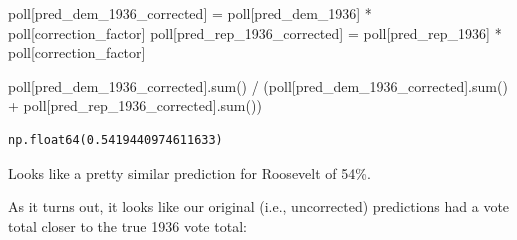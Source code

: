 \documentclass[
  letterpaper,
  DIV=11,
  numbers=noendperiod]{scrreprt}
\newenvironment{Shaded}{\begin{snugshade}}{\end{snugshade}}
\newcommand{\BuiltInTok}[1]{\textcolor[rgb]{0.00,0.23,0.31}{#1}}
\newcommand{\NormalTok}[1]{\textcolor[rgb]{0.00,0.23,0.31}{#1}}
\newcommand{\OperatorTok}[1]{\textcolor[rgb]{0.37,0.37,0.37}{#1}}
\newcommand{\StringTok}[1]{\textcolor[rgb]{0.13,0.47,0.30}{#1}}
\begin{document}
\begin{Shaded}
\begin{Highlighting}[]
\NormalTok{poll[}\StringTok{\textquotesingle{}pred\_dem\_1936\_corrected\textquotesingle{}}\NormalTok{] }\OperatorTok{=}\NormalTok{ poll[}\StringTok{\textquotesingle{}pred\_dem\_1936\textquotesingle{}}\NormalTok{] }\OperatorTok{*}\NormalTok{ poll[}\StringTok{\textquotesingle{}correction\_factor\textquotesingle{}}\NormalTok{]}
\NormalTok{poll[}\StringTok{\textquotesingle{}pred\_rep\_1936\_corrected\textquotesingle{}}\NormalTok{] }\OperatorTok{=}\NormalTok{ poll[}\StringTok{\textquotesingle{}pred\_rep\_1936\textquotesingle{}}\NormalTok{] }\OperatorTok{*}\NormalTok{ poll[}\StringTok{\textquotesingle{}correction\_factor\textquotesingle{}}\NormalTok{]}

\NormalTok{poll[}\StringTok{\textquotesingle{}pred\_dem\_1936\_corrected\textquotesingle{}}\NormalTok{].}\BuiltInTok{sum}\NormalTok{() }\OperatorTok{/}\NormalTok{ (poll[}\StringTok{\textquotesingle{}pred\_dem\_1936\_corrected\textquotesingle{}}\NormalTok{].}\BuiltInTok{sum}\NormalTok{() }\OperatorTok{+}\NormalTok{ poll[}\StringTok{\textquotesingle{}pred\_rep\_1936\_corrected\textquotesingle{}}\NormalTok{].}\BuiltInTok{sum}\NormalTok{())}
\end{Highlighting}
\end{Shaded}

\begin{verbatim}
np.float64(0.5419440974611633)
\end{verbatim}

Looks like a pretty similar prediction for Roosevelt of 54\%.

As it turns out, it looks like our original (i.e., uncorrected)
predictions had a vote total closer to the true 1936 vote total:
\end{document}
